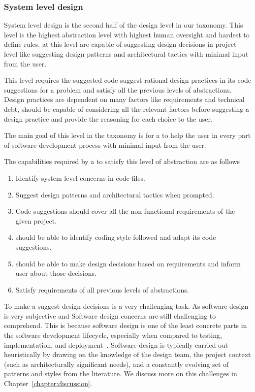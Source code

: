 \subsubsection{System level design}
\label{high_design}
System level design is the second half of the design level in our taxonomy. This level is the highest abstraction level with highest human oversight and hardest to define rules.
\cct{} at this level are capable of suggesting design decisions in project level like suggesting design patterns and architectural tactics with minimal input from the user.

This level requires the suggested code suggest rational design practices in its code suggestions for a problem and satisfy all the previous levels of abstractions. Design practices are dependent on many factors like requirements and technical debt, \cct{} should be capable of considering all the relevant factors before suggesting a design practice and provide the reasoning for each choice to the user.

The main goal of this level in the taxonomy is for a \cct{} to help the user in every part of software development process with minimal input from the user.

The capabilities required by a \cct{} to satisfy this level of abstraction are as follows
\begin{enumerate}
    \item Identify system level concerns in code files.
    \item Suggest design patterns and architectural tactics when prompted.
    \item Code suggestions should cover all the non-functional requirements of the given project.
    \item \cct{} should be able to identify coding style followed and adapt its code suggestions.
    \item \cct{} should be able to make design decisions based on requirements and inform user about those decisions.
    \item Satisfy requirements of all previous levels of abstractions.
\end{enumerate}

To make a \cct{} suggest design decisions is a very challenging task. 
As software design is very subjective and Software design concerns are still challenging to comprehend. 
This is because software design is one of the least concrete parts in the software development lifecycle, especially when compared to testing, implementation, and deployment~\cite{sedesign}. 
Software design is typically carried out heuristically by drawing on the knowledge of the design team, the project context (such as architecturally significant needs), and a constantly evolving set of patterns and styles from the literature. We discuss more on this challenges in Chapter~\ref{chapter:discussion}.